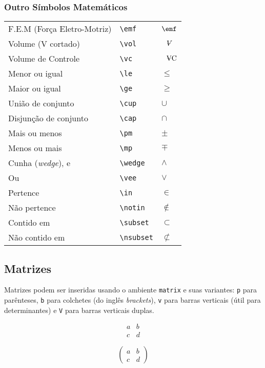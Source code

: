 \documentclass{gjvnq-livreto}
\begin{document}
\subsubsection{Outro Símbolos Matemáticos}
\begin{codeBox}
\begin{longtable}{ll|l}
F.E.M (Força Eletro-Motriz) & \verb|\emf| & $\emf$ \\
Volume (V cortado) & \verb|\vol| & $\vol$ \\
Volume de Controle & \verb|\vc| & $\vc$ \\
Menor ou igual & \verb|\le| & $\le$ \\
Maior ou igual & \verb|\ge| & $\ge$ \\
União de conjunto & \verb|\cup| & $\cup$ \\
Disjunção de conjunto & \verb|\cap| & $\cap$ \\
Mais ou menos & \verb|\pm| & $\pm$ \\
Menos ou mais & \verb|\mp| & $\mp$ \\
Cunha (\emph{wedge}), e & \verb|\wedge| & $\wedge$ \\
Ou & \verb|\vee| & $\vee$ \\
Pertence & \verb|\in| & $\in$ \\
Não pertence & \verb|\notin| & $\notin$ \\
Contido em & \verb|\subset| & $\subset$ \\
Não contido em & \verb|\nsubset| & $\nsubset$ \\
\end{longtable}
\end{codeBox}

\subsection{Matrizes}

Matrizes podem ser inseridas usando o ambiente \verb|matrix| e suas variantes: \verb|p| para parênteses, \verb|b| para colchetes (do inglês \emph{brackets}), \verb|v| para barras verticais (útil para determinantes) e \verb|V| para barras verticais duplas.

\begin{latexExampleSide}
\[ \begin{matrix} 
a & b \\
c & d 
\end{matrix} \]
\end{latexExampleSide}

\begin{latexExampleSide}
\[ \begin{pmatrix} 
a & b \\
c & d 
\end{pmatrix} \]
\end{latexExampleSide}
\end{document}
